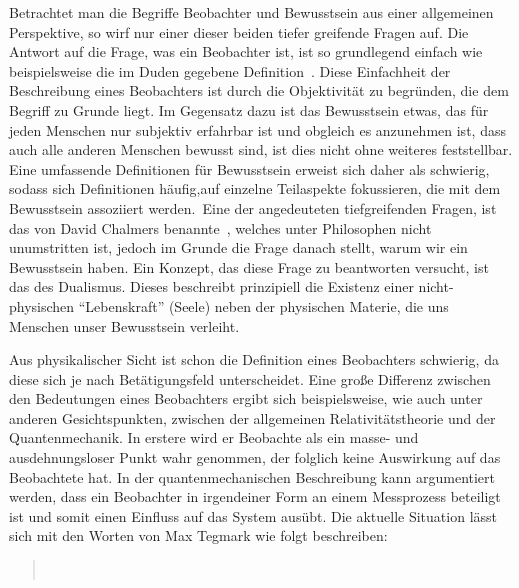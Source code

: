 
Betrachtet man die Begriffe Beobachter und Bewusstsein aus einer 
allgemeinen Perspektive, so wirf nur einer dieser beiden 
tiefer greifende Fragen auf. Die Antwort auf die Frage, was ein Beobachter ist,
ist so grundlegend einfach wie beispielsweise die im
Duden gegebene Definition \,\cite{duden_observer}.
Diese Einfachheit der Beschreibung eines Beobachters ist durch die Objektivität zu begründen,
die dem Begriff zu Grunde liegt. Im Gegensatz dazu ist das Bewusstsein etwas, das für jeden Menschen
nur subjektiv erfahrbar ist und obgleich es anzunehmen ist, dass auch alle anderen Menschen bewusst sind,
ist dies nicht ohne weiteres feststellbar. Eine umfassende Definitionen für Bewusstsein erweist sich daher als 
schwierig, sodass sich Definitionen häufig,auf einzelne Teilaspekte fokussieren, die mit dem Bewusstsein assoziiert 
werden.\,\cite{duden_consciousness}
Eine der angedeuteten tiefgreifenden Fragen, ist das von David Chalmers benannte \,\cite{Chalmers_95}, welches unter Philosophen nicht unumstritten ist, jedoch im Grunde 
die Frage danach stellt, warum wir ein Bewusstsein haben. Ein Konzept, das diese Frage zu beantworten 
versucht, ist das des Dualismus. Dieses beschreibt prinzipiell die Existenz einer nicht-physischen
\enquote{Lebenskraft} (Seele) neben der physischen Materie, die uns Menschen unser Bewusstsein verleiht.


Aus physikalischer Sicht ist schon die Definition eines Beobachters schwierig, da diese sich je nach 
Betätigungsfeld unterscheidet. Eine große Differenz zwischen den Bedeutungen eines Beobachters
ergibt sich beispielsweise, wie auch unter anderen Gesichtspunkten, 
zwischen der allgemeinen Relativitätstheorie und der Quantenmechanik. In erstere wird er Beobachte als ein
masse- und ausdehnungsloser Punkt wahr genommen, der folglich keine Auswirkung auf das Beobachtete hat.
In der quantenmechanischen Beschreibung kann argumentiert werden, dass ein Beobachter in irgendeiner 
Form an einem Messprozess beteiligt ist und somit einen Einfluss auf das System ausübt.
Die aktuelle Situation lässt sich mit den Worten von Max Tegmark wie folgt beschreiben: 
\begin{quote}
	\,\cite{Tegmark_15_long}
\end{quote}   

